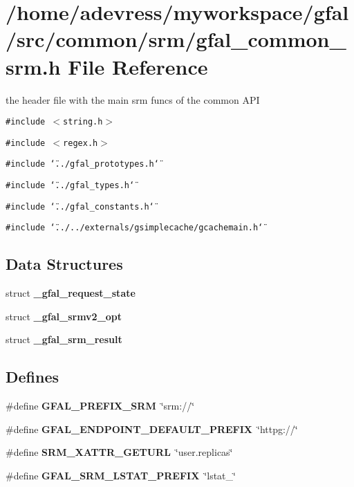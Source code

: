 \section{/home/adevress/myworkspace/gfal/src/common/srm/gfal\_\-common\_\-srm.h File Reference}
\label{gfal__common__srm_8h}
the header file with the main srm funcs of the common API 

{\tt \#include $<$string.h$>$}\par
{\tt \#include $<$regex.h$>$}\par
{\tt \#include \char`\"{}../gfal\_\-prototypes.h\char`\"{}}\par
{\tt \#include \char`\"{}../gfal\_\-types.h\char`\"{}}\par
{\tt \#include \char`\"{}../gfal\_\-constants.h\char`\"{}}\par
{\tt \#include \char`\"{}../../externals/gsimplecache/gcachemain.h\char`\"{}}\par
\subsection*{Data Structures}
\begin{CompactItemize}
\item 
struct \bf{\_\-gfal\_\-request\_\-state}
\item 
struct \textbf{\_\-gfal\_\-srmv2\_\-opt}
\item 
struct \textbf{\_\-gfal\_\-srm\_\-result}
\end{CompactItemize}
\subsection*{Defines}
\begin{CompactItemize}
\item 
\#define \textbf{GFAL\_\-PREFIX\_\-SRM}~\char`\"{}srm://\char`\"{}\label{gfal__common__srm_8h_c163cc407dc64638a5f13fe1d7ceb858}

\item 
\#define \textbf{GFAL\_\-ENDPOINT\_\-DEFAULT\_\-PREFIX}~\char`\"{}httpg://\char`\"{}\label{gfal__common__srm_8h_496c8a18054866dcb27ae3f3397ac303}

\item 
\#define \textbf{SRM\_\-XATTR\_\-GETURL}~\char`\"{}user.replicas\char`\"{}\label{gfal__common__srm_8h_cfb5da2e23958bb6b8ae0f60135fbfd7}

\item 
\#define \textbf{GFAL\_\-SRM\_\-LSTAT\_\-PREFIX}~\char`\"{}lstat\_\-\char`\"{}\label{gfal__common__srm_8h_93786bf5408138dc3fe440112663d89a}

\end{CompactItemize}
